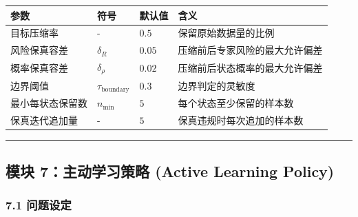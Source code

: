 \documentclass[
  12pt,
]{ctexart}
\begin{document}
\begin{longtable}[]{@{}
  >{\raggedright\arraybackslash}p{}
  >{\raggedright\arraybackslash}p{}
  >{\raggedright\arraybackslash}p{}
  >{\raggedright\arraybackslash}p{}@{}}
\toprule\noalign{}
\begin{minipage}[b]{\linewidth}\raggedright
参数
\end{minipage} & \begin{minipage}[b]{\linewidth}\raggedright
符号
\end{minipage} & \begin{minipage}[b]{\linewidth}\raggedright
默认值
\end{minipage} & \begin{minipage}[b]{\linewidth}\raggedright
含义
\end{minipage} \\
\midrule\noalign{}
\endhead
\bottomrule\noalign{}
\endlastfoot
目标压缩率 & - & \(0.5\) & 保留原始数据量的比例 \\
风险保真容差 & \(\delta_R\) & \(0.05\) &
压缩前后专家风险的最大允许偏差 \\
概率保真容差 & \(\delta_\rho\) & \(0.02\) &
压缩前后状态概率的最大允许偏差 \\
边界阈值 & \(\tau_{\text{boundary}}\) & \(0.3\) & 边界判定的灵敏度 \\
最小每状态保留数 & \(n_{\min}\) & \(5\) & 每个状态至少保留的样本数 \\
保真迭代追加量 & - & \(5\) & 保真违规时每次追加的样本数 \\
\end{longtable}

\begin{center}\rule{0.5\linewidth}{0.5pt}\end{center}

\subsection{模块 7：主动学习策略 (Active Learning
Policy)}\label{ux6a21ux5757-7ux4e3bux52a8ux5b66ux4e60ux7b56ux7565-active-learning-policy}

\subsubsection{7.1 问题设定}\label{ux95eeux9898ux8bbeux5b9a-6}
\end{document}

